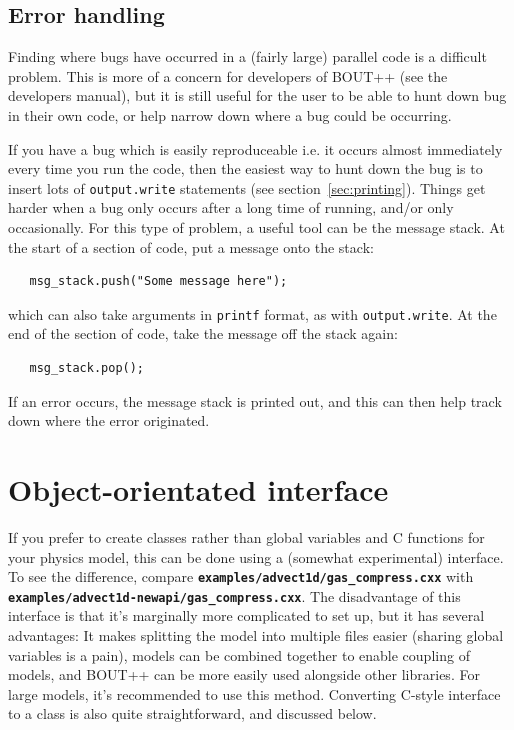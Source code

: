 \documentclass[12pt]{article}
\newcommand{\code}[1]{\texttt{#1}}
\newcommand{\file}[1]{\texttt{\bf #1}}
\begin{document}
\subsection{Error handling}

Finding where bugs have occurred in a (fairly large) parallel code is a difficult problem.
This is more of a concern for developers of BOUT++ (see the developers manual), but it is still
useful for the user to be able to hunt down bug in their own code, or help narrow down where
a bug could be occurring.

If you have a bug which is easily reproduceable i.e. it occurs almost immediately every time
you run the code, then the easiest way to hunt down the bug is to insert lots of \code{output.write}
statements (see section~\ref{sec:printing}). Things get harder when a bug only occurs after a long time
of running, and/or only occasionally. For this type of problem, a useful tool
can be the message stack.
At the start of a section of code, put a message onto the stack: 
\begin{lstlisting}
   msg_stack.push("Some message here");
\end{lstlisting}
which can also take arguments in \code{printf} format, as with \code{output.write}. At the end of the section of code, take the message off the stack again:
\begin{lstlisting}
   msg_stack.pop();
\end{lstlisting}
If an error occurs, the message stack is printed out, and this can then
help track down where the error originated.

\section{Object-orientated interface}
\label{sec:newapi}

If you prefer to create classes rather than global variables and C functions for your physics model,
this can be done using a (somewhat experimental) interface. To see the difference,
compare \file{examples/advect1d/gas\_compress.cxx} with\\
\file{examples/advect1d-newapi/gas\_compress.cxx}. The disadvantage of this interface
is that it's marginally more complicated to set up, but it has several advantages: It makes splitting
the model into multiple files easier (sharing global variables is a pain), models can be combined
together to enable coupling of models, and BOUT++ can be more easily used alongside other libraries.
For large models, it's recommended to use this method. Converting
C-style interface to a class is also quite straightforward, and discussed below.
\end{document}
